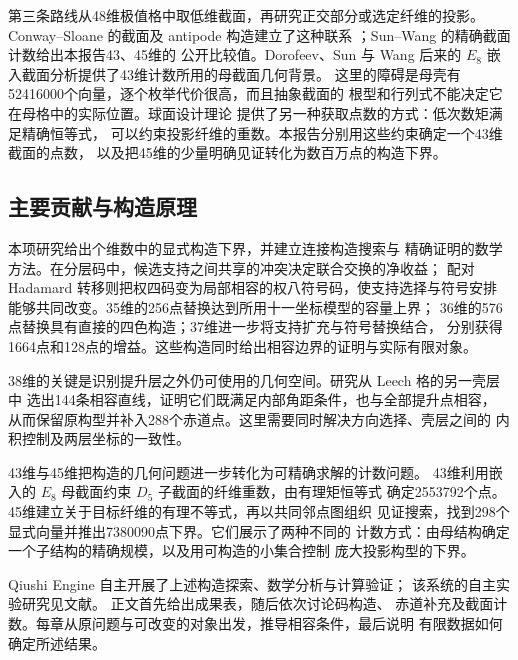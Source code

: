 第三条路线从48维极值格中取低维截面，再研究正交部分或选定纤维的投影。
Conway--Sloane 的截面及 antipode 构造建立了这种联系
\cite{laminated,antipode}；Sun--Wang 的精确截面计数给出本报告43、45维的
公开比较值\cite{sunwang-sections,crosssections}。Dorofeev、Sun 与 Wang 后来的
$E_8$ 嵌入截面分析\cite{dorofeev}提供了43维计数所用的母截面几何背景。
这里的障碍是母壳有52416000个向量，逐个枚举代价很高，而且抽象截面的
根型和行列式不能决定它在母格中的实际位置。球面设计理论
\cite{dgs,nebe-designs}提供了另一种获取点数的方式：低次数矩满足精确恒等式，
可以约束投影纤维的重数。本报告分别用这些约束确定一个43维截面的点数，
以及把45维的少量明确见证转化为数百万点的构造下界。

\subsection{主要贡献与构造原理}

本项研究给出\ResultCount{}个维数中的显式构造下界，并建立连接构造搜索与
精确证明的数学方法。在分层码中，候选支持之间共享的冲突决定联合交换的净收益；
配对 Hadamard 转移则把权四码变为局部相容的权八符号码，使支持选择与符号安排
能够共同改变。35维的256点替换达到所用十一坐标模型的容量上界；
36维的576点替换具有直接的四色构造；37维进一步将支持扩充与符号替换结合，
分别获得1664点和128点的增益。这些构造同时给出相容边界的证明与实际有限对象。

38维的关键是识别提升层之外仍可使用的几何空间。研究从 Leech 格的另一壳层中
选出144条相容直线，证明它们既满足内部角距条件，也与全部提升点相容，
从而保留原构型并补入288个赤道点。这里需要同时解决方向选择、壳层之间的
内积控制及两层坐标的一致性。

43维与45维把构造的几何问题进一步转化为可精确求解的计数问题。
43维利用嵌入的 $E_8$ 母截面约束 $D_5$ 子截面的纤维重数，由有理矩恒等式
确定2553792个点。45维建立关于目标纤维的有理不等式，再以共同邻点图组织
见证搜索，找到298个显式向量并推出7380090点下界。它们展示了两种不同的
计数方式：由母结构确定一个子结构的精确规模，以及用可构造的小集合控制
庞大投影构型的下界。

Qiushi Engine 自主开展了上述构造探索、数学分析与计算验证；
该系统的自主实验研究见文献\cite{qiushi-optics}。
正文首先给出成果表，随后依次讨论码构造、
赤道补充及截面计数。每章从原问题与可改变的对象出发，推导相容条件，最后说明
有限数据如何确定所述结果。
